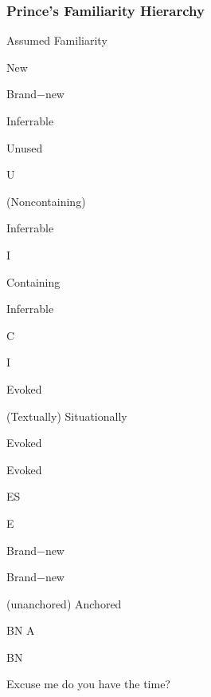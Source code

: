 \documentclass[compress,color=usenames]{beamer}
\begin{document}
\begin{frame}
\frametitle{
Prince's Familiarity Hierarchy}



Assumed Familiarity






New






Brand$-$new






Inferrable






Unused



U






(Noncontaining)



Inferrable



I






Containing



Inferrable



C



I






Evoked






(Textually) Situationally



Evoked



Evoked



ES



E






Brand$-$new



Brand$-$new



(unanchored) Anchored



BN A



BN






Excuse me do you have the time?










\end{frame}
\end{document}
